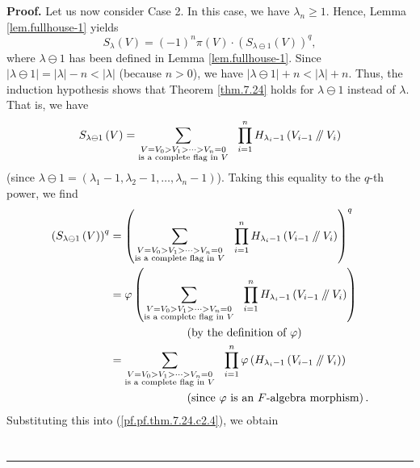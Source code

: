 \documentclass[numbers=enddot,12pt,final,onecolumn,notitlepage]{scrartcl}%
\numberwithin{exer}{section}
\theoremstyle{definition}
\newenvironment{proof}[1][Proof]{\noindent\textbf{#1.} }{\ \rule{0.5em}{0.5em}}
\let\sumnonlimits\sum
\let\prodnonlimits\prod
\renewcommand{\sum}{\sumnonlimits\limits}
\renewcommand{\prod}{\prodnonlimits\limits}
\newcommand{\sslash}{\mathbin{/\mkern-5mu/}}
\theoremstyle{plainsl}
\begin{document}
\begin{proof}
Let us now consider Case 2. In this case, we have $\lambda_{n}\geq1$. Hence,
Lemma \ref{lem.fullhouse-1} yields
\begin{equation}
S_{\lambda}\left(  V\right)  =\left(  -1\right)  ^{n}\pi\left(  V\right)
\cdot\left(  S_{\lambda\ominus1}\left(  V\right)  \right)  ^{q},
\label{pf.pf.thm.7.24.c2.4}%
\end{equation}
where $\lambda\ominus1$ has been defined in Lemma \ref{lem.fullhouse-1}. Since
$\left\vert \lambda\ominus1\right\vert =\left\vert \lambda\right\vert
-n<\left\vert \lambda\right\vert $ (because $n>0$), we have $\left\vert
\lambda\ominus1\right\vert +n<\left\vert \lambda\right\vert +n$. Thus, the
induction hypothesis shows that Theorem \ref{thm.7.24} holds for
$\lambda\ominus1$ instead of $\lambda$. That is, we have%
\begin{equation}
S_{\lambda\ominus1}\left(  V\right)  =\sum_{\substack{V=V_{0}>V_{1}%
>\cdots>V_{n}=0\\\text{is a complete flag in }V}}\ \ \prod_{i=1}^{n}%
H_{\lambda_{i}-1}\left(  V_{i-1}\sslash V_{i}\right)
\label{pf.pf.thm.7.24.c2.5}%
\end{equation}
(since $\lambda\ominus1=\left(  \lambda_{1}-1,\lambda_{2}-1,\ldots,\lambda
_{n}-1\right)  $). Taking this equality to the $q$-th power, we find%
\begin{align*}
\left(  S_{\lambda\ominus1}\left(  V\right)  \right)  ^{q}  &  =\left(
\sum_{\substack{V=V_{0}>V_{1}>\cdots>V_{n}=0\\\text{is a complete flag in }%
V}}\ \ \prod_{i=1}^{n}H_{\lambda_{i}-1}\left(  V_{i-1}\sslash V_{i}\right)
\right)  ^{q}\\
&  =\varphi\left(  \sum_{\substack{V=V_{0}>V_{1}>\cdots>V_{n}=0\\\text{is a
complete flag in }V}}\ \ \prod_{i=1}^{n}H_{\lambda_{i}-1}\left(
V_{i-1}\sslash V_{i}\right)  \right) \\
&  \ \ \ \ \ \ \ \ \ \ \ \ \ \ \ \ \ \ \ \ \left(  \text{by the definition of
}\varphi\right) \\
&  =\sum_{\substack{V=V_{0}>V_{1}>\cdots>V_{n}=0\\\text{is a complete flag in
}V}}\ \ \prod_{i=1}^{n}\varphi\left(  H_{\lambda_{i}-1}\left(  V_{i-1}%
\sslash V_{i}\right)  \right) \\
&  \ \ \ \ \ \ \ \ \ \ \ \ \ \ \ \ \ \ \ \ \left(  \text{since }\varphi\text{
is an }F\text{-algebra morphism}\right)  .
\end{align*}
Substituting this into (\ref{pf.pf.thm.7.24.c2.4}), we obtain%
\begin{align*}

\end{align*}
\end{proof}
\end{document}
